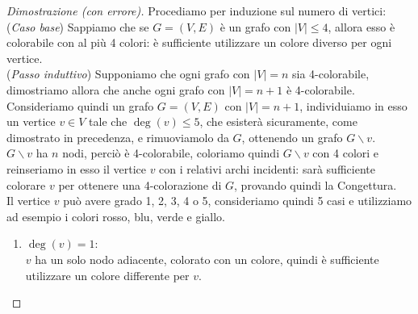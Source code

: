 \documentclass[a4paper,12pt,titlepage]{report}
\begin{document}
    \begin{proof}[Dimostrazione (con errore)]
        \noindent Procediamo per induzione sul numero di vertici:
        \\(\emph{Caso base}) Sappiamo che se $G = (V,E)$ è un grafo con $\lvert V \rvert \leq 4$, allora esso è colorabile con al più 4 colori: è sufficiente utilizzare un colore diverso per ogni vertice.
        \\(\emph{Passo induttivo}) Supponiamo che ogni grafo con $\lvert V \rvert = n$ sia 4-colorabile, dimostriamo allora che anche ogni grafo con $\lvert V \rvert = n + 1$ è 4-colorabile.
        \\Consideriamo quindi un grafo $G = (V, E)$ con $\lvert V \rvert = n + 1$, individuiamo in esso un vertice $v \in V$ tale che $\deg(v) \leq 5$, che esisterà sicuramente, come dimostrato in precedenza, e rimuoviamolo da $G$, ottenendo un grafo $G \smallsetminus v$.
        \\$G \smallsetminus v$ ha $n$ nodi, perciò è 4-colorabile, coloriamo quindi $G \smallsetminus v$ con 4 colori e reinseriamo in esso il vertice $v$ con i relativi archi incidenti: sarà sufficiente colorare $v$ per ottenere una 4-colorazione di $G$, provando quindi la Congettura.
        \\Il vertice $v$ può avere grado 1, 2, 3, 4 o 5, consideriamo quindi 5 casi e utilizziamo ad esempio i colori rosso, blu, verde e giallo.
        \begin{enumerate}
        	\item $\deg(v) = 1$:
        	\\$v$ ha un solo nodo adiacente, colorato con un colore, quindi è sufficiente utilizzare un colore differente per $v$.
        	\begin{figure}[H]
        		\centering
\end{figure}
\end{enumerate}
\end{proof}
\end{document}
